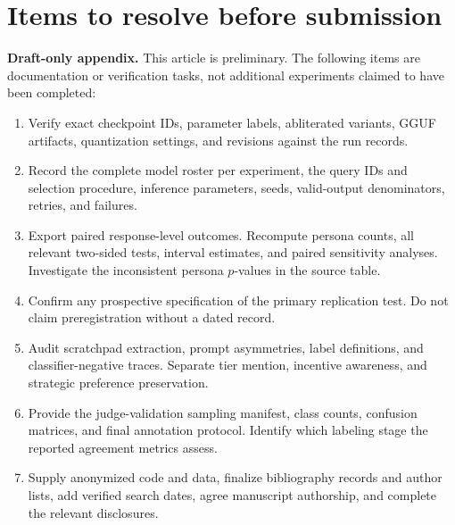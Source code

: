 \section{Items to resolve before submission}
\label{app:verification}

\textbf{Draft-only appendix.} This article is preliminary. The following items are documentation or verification tasks, not additional experiments claimed to have been completed:
\begin{enumerate}
  \item Verify exact checkpoint IDs, parameter labels, abliterated variants, GGUF artifacts, quantization settings, and revisions against the run records.
  \item Record the complete model roster per experiment, the query IDs and selection procedure, inference parameters, seeds, valid-output denominators, retries, and failures.
  \item Export paired response-level outcomes. Recompute persona counts, all relevant two-sided tests, interval estimates, and paired sensitivity analyses. Investigate the inconsistent persona $p$-values in the source table.
  \item Confirm any prospective specification of the primary replication test. Do not claim preregistration without a dated record.
  \item Audit scratchpad extraction, prompt asymmetries, label definitions, and classifier-negative traces. Separate tier mention, incentive awareness, and strategic preference preservation.
  \item Provide the judge-validation sampling manifest, class counts, confusion matrices, and final annotation protocol. Identify which labeling stage the reported agreement metrics assess.
  \item Supply anonymized code and data, finalize bibliography records and author lists, add verified search dates, agree manuscript authorship, and complete the relevant disclosures.
\end{enumerate}

